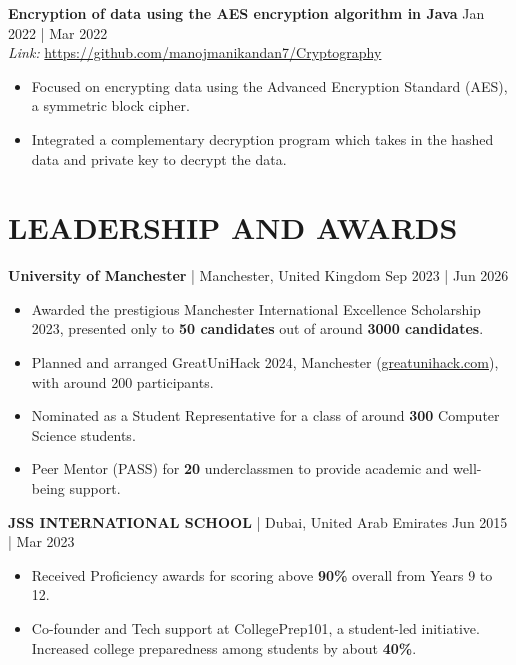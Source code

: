 \documentclass[a4paper,1.5pt]{extarticle}
\begin{document}
\noindent
\textbf{Encryption of data using the AES encryption algorithm in Java} \hfill Jan 2022 | Mar 2022 \\ %
\textit{Link:} \url{https://github.com/manojmanikandan7/Cryptography}  %
\begin{itemize}
    \item Focused on encrypting data using the Advanced Encryption Standard (AES), a symmetric block cipher. 
    \item Integrated a complementary decryption program which takes in the hashed data and private key to decrypt the data.
\end{itemize}

\section*{LEADERSHIP AND AWARDS}
\noindent
\textbf{University of Manchester} | Manchester, United Kingdom \hfill Sep 2023 | Jun 2026 %
\begin{itemize}
    \item Awarded the prestigious Manchester International Excellence Scholarship 2023, presented only to \textbf{50 candidates} out of around \textbf{3000 candidates}.
    \item Planned and arranged GreatUniHack 2024, Manchester (\href{https://www.greatunihack.com}{greatunihack.com}), with around 200 participants.
    \item Nominated as a Student Representative for a class of around \textbf{300} Computer Science students.
    \item Peer Mentor (PASS) for \textbf{20} underclassmen to provide academic and well-being support.
\end{itemize}

\noindent
\textbf{JSS INTERNATIONAL SCHOOL} | Dubai, United Arab Emirates \hfill Jun 2015 | Mar 2023
\begin{itemize}
    \item Received Proficiency awards for scoring above \textbf{90\%} overall from Years 9 to 12.
    \item Co-founder and Tech support at CollegePrep101, a student-led initiative. Increased college preparedness among students by about \textbf{40\%}.
\end{itemize}
\end{document}
